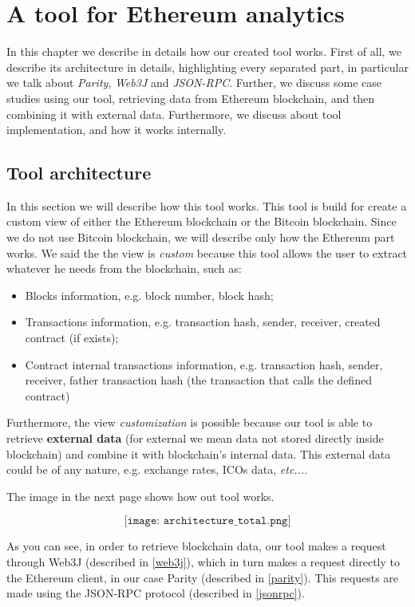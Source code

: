 \label{Chapter3}

\chapter{A tool for Ethereum analytics}
In this chapter we describe in details how our created tool works. First of all, we describe its architecture in details, highlighting every separated part, in particular we talk about \textit{Parity}, \textit{Web3J} and \textit{JSON-RPC}. Further, we discuss some case studies using our tool, retrieving data from Ethereum blockchain, and then combining it with external data. Furthermore, we discuss about tool implementation, and how it works internally.
\section{Tool architecture}
In this section we will describe how this tool works. This tool is build for create a custom view of either the Ethereum blockchain or the Bitcoin blockchain.
\newline 
Since we do not use Bitcoin blockchain, we will describe only how the Ethereum part works. We said the the view is \textit{custom} because this tool allows the user to extract whatever he needs from the blockchain, such as:
\begin{itemize}
    \item Blocks information, e.g. block number, block hash;
    \item Transactions information, e.g. transaction hash, sender, receiver, created contract (if exists);
    \item Contract internal transactions information, e.g. transaction hash, sender, receiver, father transaction hash (the transaction that calls the defined contract)
\end{itemize}

Furthermore, the view \textit{customization} is possible because our tool is able to retrieve \textbf{external data} (for external we mean data not stored directly inside blockchain) and combine it with blockchain's internal data. This external data could be of any nature, e.g. exchange rates, ICOs data, \textit{etc...}.

The image in the next page shows how out tool works. %
\begin{center}
    \[
        \texttt{[image: architecture\_total.png]}
    \]
\end{center}
As you can see, in order to retrieve blockchain data, our tool makes a request through Web3J (described in \ref{web3j}), which in turn makes a request directly to the Ethereum client, in our case Parity (described in \ref{parity}). This requests are made using the JSON-RPC protocol (described in \ref{jsonrpc}). 

